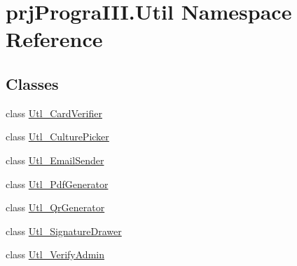 \hypertarget{namespaceprj_progra_i_i_i_1_1_util}{}\section{prj\+Progra\+I\+I\+I.\+Util Namespace Reference}
\label{namespaceprj_progra_i_i_i_1_1_util}
\subsection*{Classes}
\begin{DoxyCompactItemize}
\item 
class \hyperlink{classprj_progra_i_i_i_1_1_util_1_1_utl___card_verifier}{Utl\+\_\+\+Card\+Verifier}
\item 
class \hyperlink{classprj_progra_i_i_i_1_1_util_1_1_utl___culture_picker}{Utl\+\_\+\+Culture\+Picker}
\item 
class \hyperlink{classprj_progra_i_i_i_1_1_util_1_1_utl___email_sender}{Utl\+\_\+\+Email\+Sender}
\item 
class \hyperlink{classprj_progra_i_i_i_1_1_util_1_1_utl___pdf_generator}{Utl\+\_\+\+Pdf\+Generator}
\item 
class \hyperlink{classprj_progra_i_i_i_1_1_util_1_1_utl___qr_generator}{Utl\+\_\+\+Qr\+Generator}
\item 
class \hyperlink{classprj_progra_i_i_i_1_1_util_1_1_utl___signature_drawer}{Utl\+\_\+\+Signature\+Drawer}
\item 
class \hyperlink{classprj_progra_i_i_i_1_1_util_1_1_utl___verify_admin}{Utl\+\_\+\+Verify\+Admin}
\end{DoxyCompactItemize}
